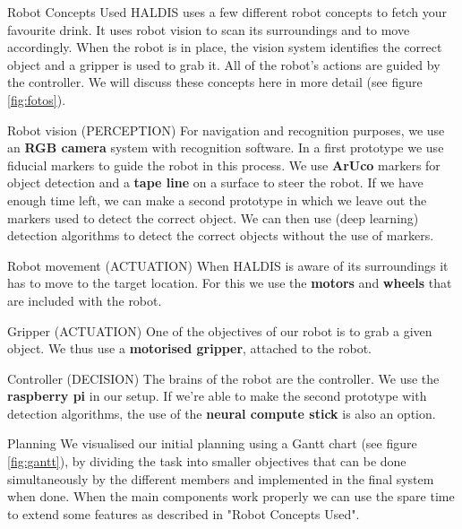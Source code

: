 \documentclass{beamer}
\begin{document}
\begin{frame}[t,fragile]
\begin{columns}[T,totalwidth=\textwidth]
	\begin{column}{.48\textwidth}
		
	\begin{block}{Robot Concepts Used}
	HALDIS uses a few different robot concepts to fetch your favourite drink. It uses robot vision to scan its surroundings and to move accordingly. 
	When the robot is in place, the vision system identifies the correct object and a gripper is used to grab it.
	All of the robot's actions are guided by the controller. 
	We will discuss these concepts here in more detail (see figure \ref{fig:fotos}).
	
	\begin{exampleblock}{Robot vision (PERCEPTION)}
	For navigation and recognition purposes, we use an \textbf{RGB camera} system with recognition software.
	In a first prototype we use fiducial markers to guide the robot in this process.
	We use \textbf{ArUco} markers for object detection and a \textbf{tape line} on a surface to steer the robot.
	If we have enough time left, we can make a second prototype in which we leave out the markers used to detect the correct object.
	We can then use (deep learning) detection algorithms to detect the correct objects without the use of markers.
	\end{exampleblock}

	\begin{exampleblock}{Robot movement (ACTUATION)}
	When HALDIS is aware of its surroundings it has to move to the target location.
	For this we use the \textbf{motors} and \textbf{wheels} that are included with the robot.
	\end{exampleblock}
	
	\begin{exampleblock}{Gripper (ACTUATION)}
	One of the objectives of our robot is to grab a given object.
	We thus use a \textbf{motorised gripper}, attached to the robot.
	\end{exampleblock}
	
	\begin{exampleblock}{Controller (DECISION)}
	The brains of the robot are the controller. 
	We use the \textbf{raspberry pi} in our setup. 
	If we're able to make the second prototype with detection algorithms, the use of the \textbf{neural compute stick} is also an option. 
	\end{exampleblock}
	
	
	\end{block}
	
	\begin{block}{Planning}
	We visualised our initial planning  using a Gantt chart (see figure \ref{fig:gantt}), by dividing the task into smaller objectives that can be done simultaneously by the different members and implemented in the final system when done. When the main components work properly we can use the spare time to extend some features as described in "Robot Concepts Used".         
	\end{block}
	

\end{column}
\end{columns}
\end{frame}
\end{document}

